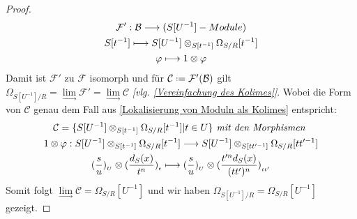 \documentclass[10pt,a4paper]{report}
\newcommand{\comment}[1]{}
\newcommand{\functionfront}[3]{\nolinebreak{#1:#2 \longrightarrow #3}}
\newcommand{\divR}[2]{\Omega_{#1/#2}}
\newcommand{\divf}[1]{d_{#1}}
\newcommand{\Tensor}[3]{#1 \otimes_{#2} #3}
\newcommand{\tensor}[3]{#1 \otimes #3}
\newcommand{\lok}[2]{#1 [#2^{-1}]}
\newcommand{\loke}[3]{(\frac{#1}{#2})_{_{#3}}}
\newcommand{\colimes}[0]{\lim\limits_{ \longrightarrow }}
\newcommand*{\defeq}{\mathrel{\vcenter{\baselineskip0.5ex \lineskiplimit0pt
                     \hbox{\scriptsize.}\hbox{\scriptsize.}}}%
                     =}
\begin{document}
\begin{proof}
{\begin{gather*}
\functionfront{\mathcal{F'}}{\mathcal{B}}{(\lok{S}{U} - Module)}\\
\lok{S}{t} \longmapsto \Tensor{\lok{S}{U}}{\lok{S}{t}}{\lok{\divR{S}{R}}{t}}\\
\varphi \longmapsto \tensor{1}{\lok{S}{t}}{\varphi}
\end{gather*}}
Damit ist $\mathcal{F'}$ zu $\mathcal{F}$ isomorph und für $\mathcal{C} \defeq \mathcal{F'}(\mathcal{B})$ gilt $\divR{\lok{S}{U}}{R}  = \colimes{\mathcal{F'}} = \colimes{\mathcal{C}}$ \textit{[vlg. \cref{Vereinfachung des Kolimes}]}.
Wobei die Form von $\mathcal{C}$ genau dem Fall aus \cref{Lokalisierung von Moduln als Kolimes} entspricht:
\begin{gather*}
\comment{\divR{\lok{S}{U}}{R}  = \colimes{\mathcal{C}} \text{, wobei:} \\}
\mathcal{C} = \lbrace \Tensor{\lok{S}{U}}{\lok{S}{t}}{\lok{\divR{S}{R}}{t}} \vert t \in U \rbrace \textit{ mit den Morphismen }\\
\functionfront{\tensor{1}{\lok{S}{t}}{\varphi}}{\Tensor{\lok{S}{U}}{\lok{S}{t}}{\lok{\divR{S}{R}}{t}}}{\Tensor{\lok{S}{U}}{\lok{S}{tt'}}{\lok{\divR{S}{R}}{tt'}}} \\
\tensor{\loke{s}{u}{U}}{\lok{S}{t}}{\loke{\divf{S}(x)}{t^n}{t}} \longmapsto \tensor{\loke{s}{u}{U}}{\lok{S}{tt'}}{\loke{t'^n\divf{S}(x)}{(tt')^n}{tt'}}
\end{gather*}
Somit folgt $\colimes \mathcal{C} = \lok{\divR{S}{R}}{U}$ und wir haben $\divR{\lok{S}{U}}{R} = \lok{\divR{S}{R}}{U}$ gezeigt.
\end{proof}
\end{document}
